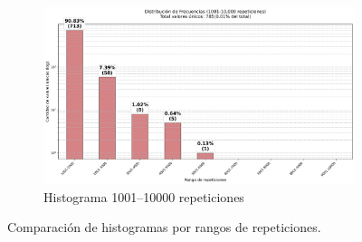 \begin{figure}[H]
    \begin{subfigure}[t]{0.48\textwidth}
        \centering
        \includegraphics[width=\linewidth]{img/histograma_1k-10k_identifier_Mobility_Data_Slim_DeDuplicate.png}
        \caption{Histograma 1001–10000 repeticiones}
        \label{fig:sub3}
    \end{subfigure}

    \caption{Comparación de histogramas por rangos de repeticiones.}
    \label{fig:histogramasDeDuplicate}
\end{figure}